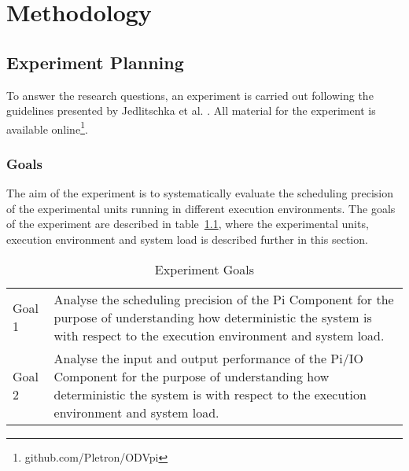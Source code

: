 \iffalse  \fi
\chapter{Methodology}

\section{Experiment Planning}
To answer the research questions, an experiment is carried out following the guidelines presented by Jedlitschka et al. \cite{Andreas}. All material for the experiment is available online\footnote{github.com/Pletron/ODVpi}. 


\subsection{Goals}

The aim of the experiment is to systematically evaluate the scheduling precision of the experimental units running in different execution environments. The goals of the experiment are described in table~\ref{table:exp-goals}, where the experimental units, execution environment and system load is described further in this section.  


\begin{table}[ht]
\begin{tabular}{l|p{12cm}}
Goal 1 & Analyse the scheduling precision of the Pi Component for the purpose of understanding how deterministic the system is with respect to the execution environment and system load. \\
Goal 2 & Analyse the input and output performance of the Pi/IO Component for the purpose of understanding how deterministic the system is with respect to the execution environment and system load.
\end{tabular}
\centering
\caption{Experiment Goals}
\label{table:exp-goals}
\end{table}


